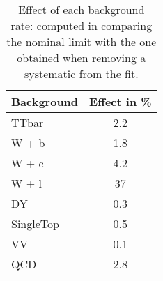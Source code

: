 \documentclass[10pt]{article}
\begin{document}
\begin{table}[!ht]
\begin{center}
\begin{tabular}{|l|c|}
\hline
\hline
\hline
\textbf{Background} & \textbf{Effect in \%} \\
\hline
TTbar            &  2.2 \\
W + b            &  1.8 \\
W + c            &  4.2 \\
W + l            &  37  \\
DY               &  0.3 \\
SingleTop        &  0.5 \\
VV               &  0.1 \\
QCD              &  2.8 \\
\hline
\hline

\hline
\hline
\end{tabular}
\caption{Effect of each background rate: computed in comparing the nominal limit with the one obtained when removing a systematic from the fit.}
\label{tab:SFtable}
\end{center}
\end{table} 
\end{document}
